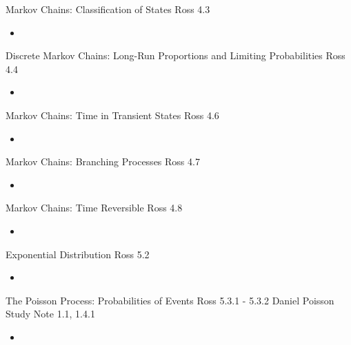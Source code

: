 \documentclass[12pt, titlepage, french]{report}
\begin{document}
\begin{CHPT_SUMM_AUTO_NUMB}[label = {L.-5}]{Markov Chains: Classification of States}
Ross 4.3
	\begin{itemize}
		\item	
	\end{itemize}
\end{CHPT_SUMM_AUTO_NUMB}

\begin{CHPT_SUMM_AUTO_NUMB}[label = {L.-6}]{Discrete Markov Chains: Long-Run Proportions and Limiting Probabilities}
Ross 4.4
	\begin{itemize}
		\item	
	\end{itemize}
\end{CHPT_SUMM_AUTO_NUMB}

\begin{CHPT_SUMM_AUTO_NUMB}[label = {L.-7}]{Markov Chains: Time in Transient States}
Ross 4.6
	\begin{itemize}
		\item	
	\end{itemize}
\end{CHPT_SUMM_AUTO_NUMB}

\begin{CHPT_SUMM_AUTO_NUMB}[label = {L.-8}]{Markov Chains: Branching Processes}
Ross 4.7
	\begin{itemize}
		\item	
	\end{itemize}
\end{CHPT_SUMM_AUTO_NUMB}

\begin{CHPT_SUMM_AUTO_NUMB}[label = {L.-9}]{Markov Chains: Time Reversible}
Ross 4.8
	\begin{itemize}
		\item	
	\end{itemize}
\end{CHPT_SUMM_AUTO_NUMB}

\begin{CHPT_SUMM_AUTO_NUMB}[label = {L.-10}]{Exponential Distribution}
Ross 5.2
	\begin{itemize}
		\item	
	\end{itemize}
\end{CHPT_SUMM_AUTO_NUMB}

\begin{CHPT_SUMM_AUTO_NUMB}[label = {L.-11}]{The Poisson Process: Probabilities of Events}
Ross 5.3.1 - 5.3.2
Daniel Poisson Study Note 1.1, 1.4.1
	\begin{itemize}
		\item	
	\end{itemize}
\end{CHPT_SUMM_AUTO_NUMB}
\end{document}
